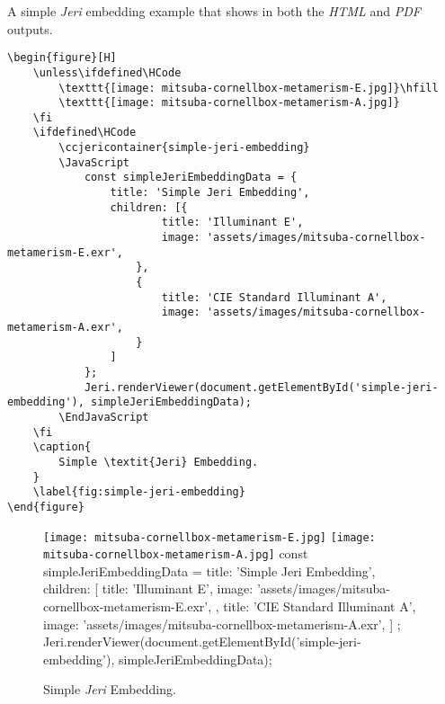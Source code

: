A simple \textit{Jeri} embedding example that shows in both the \textit{HTML}
and \textit{PDF} outputs.

\begin{lstlisting}[caption={Simple \textit{Jeri} Embedding.}]
\begin{figure}[H]
    \unless\ifdefined\HCode
        \texttt{[image: mitsuba-cornellbox-metamerism-E.jpg]}\hfill
        \texttt{[image: mitsuba-cornellbox-metamerism-A.jpg]}
    \fi
    \ifdefined\HCode
        \ccjericontainer{simple-jeri-embedding}
        \JavaScript
            const simpleJeriEmbeddingData = {
                title: 'Simple Jeri Embedding',
                children: [{
                        title: 'Illuminant E',
                        image: 'assets/images/mitsuba-cornellbox-metamerism-E.exr',
                    },
                    {
                        title: 'CIE Standard Illuminant A',
                        image: 'assets/images/mitsuba-cornellbox-metamerism-A.exr',
                    }
                ]
            };
            Jeri.renderViewer(document.getElementById('simple-jeri-embedding'), simpleJeriEmbeddingData);
        \EndJavaScript
    \fi
    \caption{
        Simple \textit{Jeri} Embedding.
    }
    \label{fig:simple-jeri-embedding}
\end{figure}
\end{lstlisting}

\begin{figure}[H]
    \unless\ifdefined\HCode
        \texttt{[image: mitsuba-cornellbox-metamerism-E.jpg]}\hfill
        \texttt{[image: mitsuba-cornellbox-metamerism-A.jpg]}
    \fi
    \ifdefined\HCode
        \JavaScript
            const simpleJeriEmbeddingData = {
                title: 'Simple Jeri Embedding',
                children: [{
                        title: 'Illuminant E',
                        image: 'assets/images/mitsuba-cornellbox-metamerism-E.exr',
                    },
                    {
                        title: 'CIE Standard Illuminant A',
                        image: 'assets/images/mitsuba-cornellbox-metamerism-A.exr',
                    }
                ]
            };
            Jeri.renderViewer(document.getElementById('simple-jeri-embedding'), simpleJeriEmbeddingData);
        \EndJavaScript
    \fi
    \caption{
        Simple \textit{Jeri} Embedding.
    }
    \label{fig:simple-jeri-embedding}
\end{figure}


